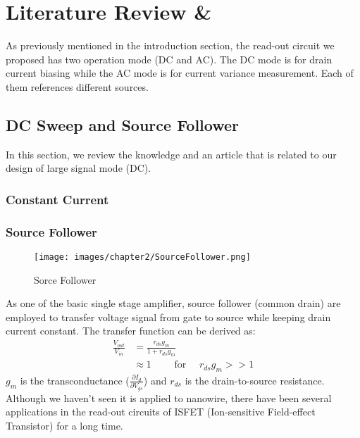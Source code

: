 \chapter{Literature Review \&}
As previously mentioned in the introduction section, the read-out circuit we proposed has two operation mode (DC and AC).
The DC mode is for drain current biasing while the AC mode is for current variance measurement.
Each of them references different sources.

\section{DC Sweep and Source Follower}
In this section, we review the knowledge and an article that is related to our design of large signal mode (DC).

\subsection{Constant Current}


\subsection{Source Follower}

\begin{figure}[h]
    \centering
    \texttt{[image: images/chapter2/SourceFollower.png]}
    \fontsize{6}{7}\selectfont
    \caption{Sorce Follower}
    \label{fig:SF}
\end{figure}

As one of the basic single stage amplifier, source follower (common drain) are employed to transfer voltage signal from gate to source while keeping drain current constant.
The transfer function can be derived as:
\setlength{\mathindent}{5.5cm}
\begin{align}
    \frac{V_{out}}{V_{in}} & = \frac{r_{ds}g_m}{1 + r_{ds}g_m} \\    \label{eq:sfTF}
                           & \approx 1 \qquad \text{ for } \quad r_{ds}g_m >> 1
\end{align}
$g_m$ is the transconductance ($\frac{\partial I_d}{\partial V_{gs}}$) and $r_{ds}$ is the drain-to-source resistance.
Although we haven't seen it is applied to nanowire, there have been several applications in the read-out circuits of ISFET (Ion-sensitive Field-effect Transistor)\cite{SF1, SF2} for a long time.

